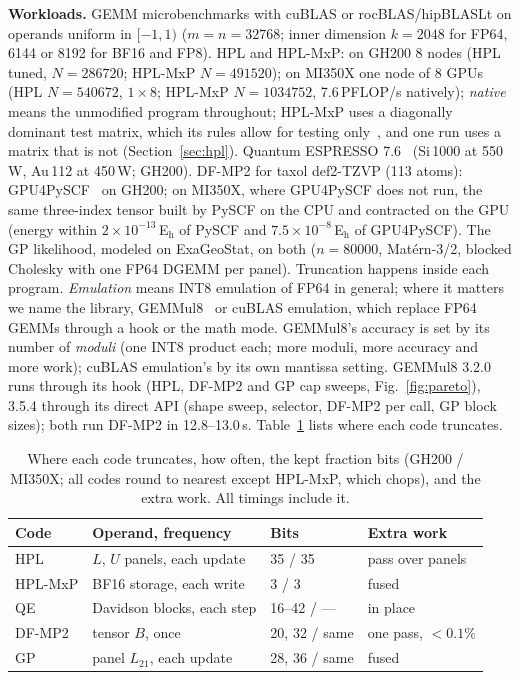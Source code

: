 \documentclass[conference]{IEEEtran}
\newcommand{\W}{\,W}
\newcommand{\Eh}{\,E$_\mathrm{h}$}
\newcommand{\ee}[2]{#1{\times}10^{#2}}  %
\newcommand{\pct}{\%}
\begin{document}
\textbf{Workloads.} GEMM microbenchmarks with cuBLAS or rocBLAS/hipBLASLt on operands uniform in $[-1,1)$
($m=n=32768$; inner dimension $k=2048$ for FP64, 6144 or 8192 for BF16 and FP8). HPL and HPL-MxP: on GH200 8 nodes (HPL tuned,
$N=286720$; HPL-MxP $N=491520$); on MI350X one node of 8 GPUs (HPL $N=540672$, $1\times8$; HPL-MxP $N=1034752$,
7.6\,PFLOP/s natively); \emph{native} means the unmodified program throughout; HPL-MxP uses a diagonally dominant test matrix, which its rules allow for testing
only~\cite{HPLMxPRules}, and one run uses a matrix that is not (Section~\ref{sec:hpl}). Quantum ESPRESSO 7.6~\cite{Giannozzi2020} (Si\,1000 at 550\W, Au\,112 at 450\W; GH200).
DF-MP2 for taxol def2-TZVP (113 atoms): GPU4PySCF~\cite{Wu2025} on GH200; on MI350X, where GPU4PySCF does not run, the
same three-index tensor built by PySCF on the CPU and contracted on the GPU (energy within $\ee{2}{-13}$\Eh{} of PySCF and
$\ee{7.5}{-8}$\Eh{} of GPU4PySCF). The GP likelihood, modeled on ExaGeoStat, on both ($n=80000$, Matérn-3/2,
blocked Cholesky with one FP64 DGEMM per panel). Truncation happens inside each program. \emph{Emulation} means INT8
emulation of FP64 in general; where it matters we name the library, GEMMul8~\cite{Uchino2025} or cuBLAS emulation, which
replace FP64 GEMMs through a hook or the math mode. GEMMul8's accuracy is set by its number of \emph{moduli} (one INT8
product each; more moduli, more accuracy and more work); cuBLAS emulation's by its own mantissa setting. GEMMul8 3.2.0 runs through its hook (HPL, DF-MP2 and GP cap sweeps, Fig.~\ref{fig:pareto}), 3.5.4
through its direct API (shape sweep, selector, DF-MP2 per call, GP block sizes); both run DF-MP2 in 12.8--13.0\,s. Table~\ref{tab:where} lists where each code truncates.

\begin{table}[t]
\caption{Where each code truncates, how often, the kept fraction bits (GH200 / MI350X; all codes round to nearest except
HPL-MxP, which chops), and the extra work. All timings include it.}\label{tab:where}
\centering\footnotesize\setlength{\tabcolsep}{2.5pt}
\begin{tabular}{@{}llll@{}}
\toprule
Code & Operand, frequency & Bits & Extra work \\
\midrule
HPL & $L$, $U$ panels, each update & 35 / 35 & pass over panels \\
HPL-MxP & BF16 storage, each write & 3 / 3 & fused \\
QE & Davidson blocks, each step & 16--42 / --- & in place \\
DF-MP2 & tensor $B$, once & 20, 32 / same & one pass, $<0.1\pct$ \\
GP & panel $L_{21}$, each update & 28, 36 / same & fused \\
\bottomrule
\end{tabular}
\end{table}
\end{document}
